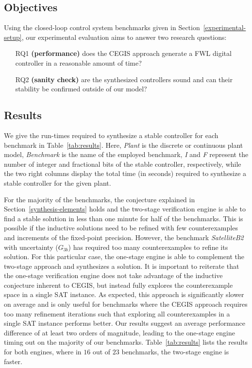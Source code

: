 \documentclass[final]{sig-alternate-05-2015}
\begin{document}
\subsection{Objectives}
\label{experimental-objectives}

Using the closed-loop control system benchmarks given in
Section~\ref{experimental-setup}, our experimental evaluation aims to answer
two research questions:
%
\begin{enumerate}

\item[RQ1] \textbf{(performance)} does the CEGIS approach generate a 
FWL digital controller in a reasonable amount of time?

\item[RQ2] \textbf{(sanity check)} are the synthesized controllers sound
and can their stability be confirmed outside of our model?

\end{enumerate}

\subsection{Results}
\label{experimental-results}

We give the run-times required to synthesize a stable controller for each
benchmark in Table~\ref{tab:results}.  Here, \textit{Plant} is the discrete
or continuous plant model, \textit{Benchmark} is the name of the employed
benchmark, \textit{I} and \textit{F} represent the number of integer and
fractional bits of the stable controller, respectively, 
while the two right columns display the total time (in seconds) required to synthesize a stable controller
for the given plant. 

For the majority of the benchmarks, the conjecture explained in
Section~\ref{synthesis-elements} holds and the two-stage verification engine
is able to find a stable solution in less than one minute for half of the
benchmarks.  This is possible if the inductive solutions need to be refined
with few counterexamples and increments of the fixed-point precision. 
However, the benchmark \emph{SatelliteB2} with uncertainty ($G_{3b}$) has
required too many counterexamples to refine its solution.  For this
particular case, the one-stage engine is able to complement the two-stage
approach and synthesizes a solution.  It is important to reiterate that the
one-stage verification engine does not take advantage of the inductive
conjecture inherent to CEGIS, but instead fully explores the counterexample
space in a single SAT instance.  As expected, this approach is significantly
slower on average and is only useful for benchmarks where the CEGIS approach
requires too many refinement iterations such that exploring all
counterexamples in a single SAT instance performs better.  Our results
suggest an average performance difference of at least two orders of
magnitude, leading to the one-stage engine timing out on the majority of our
benchmarks.  Table~\ref{tab:results} lists the results for both engines,
where in $16$ out of $23$ benchmarks, the two-stage engine is faster.
\end{document}
